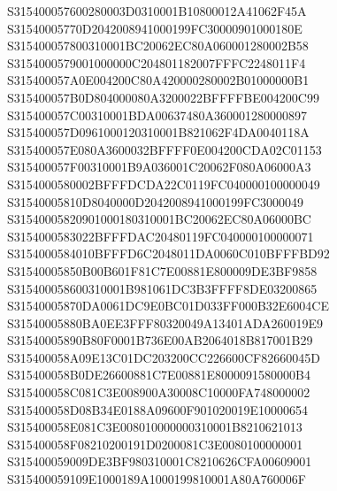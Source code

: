 \documentclass[12pt,a4paper]{article}
\begin{document}
\begin{framed}
{S315400057600280003D0310001B10800012A41062F45A\newline
S31540005770D2042008941000199FC30000901000180E\newline
S315400057800310001BC20062EC80A060001280002B58\newline
S3154000579001000000C204801182007FFFC2248011F4\newline
S315400057A0E004200C80A420000280002B01000000B1\newline
S315400057B0D804000080A3200022BFFFFBE004200C99\newline
S315400057C00310001BDA00637480A360001280000897\newline
S315400057D0961000120310001B821062F4DA0040118A\newline
S315400057E080A3600032BFFFF0E004200CDA02C01153\newline
S315400057F00310001B9A036001C20062F080A06000A3\newline
S3154000580002BFFFDCDA22C0119FC040000100000049\newline
S31540005810D8040000D2042008941000199FC3000049\newline
S31540005820901000180310001BC20062EC80A06000BC\newline
S3154000583022BFFFDAC20480119FC040000100000071\newline
S3154000584010BFFFD6C2048011DA0060C010BFFFBD92\newline
S31540005850B00B601F81C7E00881E800009DE3BF9858\newline
S315400058600310001B981061DC3B3FFFF8DE03200865\newline
S31540005870DA0061DC9E0BC01D033FF000B32E6004CE\newline
S31540005880BA0EE3FFF80320049A13401ADA260019E9\newline
S31540005890B80F0001B736E00AB2064018B817001B29\newline
S315400058A09E13C01DC203200CC226600CF82660045D\newline
S315400058B0DE26600881C7E00881E8000091580000B4\newline
S315400058C081C3E008900A30008C10000FA748000002\newline
S315400058D08B34E0188A09600F901020019E10000654\newline
S315400058E081C3E008010000000310001B8210621013\newline
S315400058F08210200191D0200081C3E0080100000001\newline
S315400059009DE3BF980310001C8210626CFA00609001\newline
S315400059109E1000189A1000199810001A80A760006F\newline
}
\end{framed}
\end{document}

